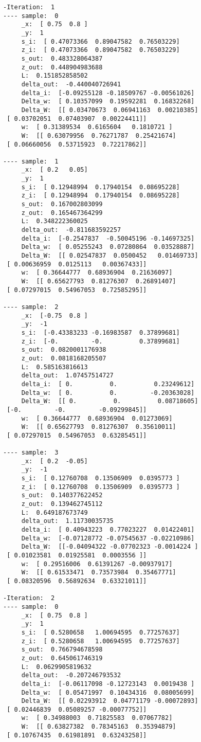 \documentclass[10pt]{article}
\begin{document}
\begin{multicols}{3}
\begin{tiny}
\begin{verbatim}
-Iteration:  1
---- sample:  0
     _x:  [ 0.75  0.8 ]
     _y:  1
     s_i:  [ 0.47073366  0.89047582  0.76503229]
     z_i:  [ 0.47073366  0.89047582  0.76503229]
     s_out:  0.483328064387
     z_out:  0.448904983688
     L:  0.151852858502
     delta_out:  -0.440040726941
     delta_i:  [-0.09255128 -0.18509767 -0.00561026]
     Delta_w:  [ 0.10357099  0.19592281  0.16832268]
     Delta_W:  [[ 0.03470673  0.06941163  0.00210385]
 [ 0.03702051  0.07403907  0.00224411]]
     w:  [ 0.31389534  0.6165604   0.1810721 ]
     W:  [[ 0.63079956  0.76271787  0.25421674]
 [ 0.06660056  0.53715923  0.72217862]]

---- sample:  1
     _x:  [ 0.2   0.05]
     _y:  1
     s_i:  [ 0.12948994  0.17940154  0.08695228]
     z_i:  [ 0.12948994  0.17940154  0.08695228]
     s_out:  0.167002803099
     z_out:  0.165467364299
     L:  0.348222360025
     delta_out:  -0.811683592257
     delta_i:  [-0.2547837  -0.50045196 -0.14697325]
     Delta_w:  [ 0.05255243  0.07280864  0.03528887]
     Delta_W:  [[ 0.02547837  0.0500452   0.01469733]
 [ 0.00636959  0.0125113   0.00367433]]
     w:  [ 0.36644777  0.68936904  0.21636097]
     W:  [[ 0.65627793  0.81276307  0.26891407]
 [ 0.07297015  0.54967053  0.72585295]]

---- sample:  2
     _x:  [-0.75  0.8 ]
     _y:  -1
     s_i:  [-0.43383233 -0.16983587  0.37899681]
     z_i:  [-0.         -0.          0.37899681]
     s_out:  0.0820001176938
     z_out:  0.0818168205507
     L:  0.585163816613
     delta_out:  1.07457514727
     delta_i:  [ 0.          0.          0.23249612]
     Delta_w:  [ 0.          0.         -0.20363028]
     Delta_W:  [[ 0.          0.          0.08718605]
 [-0.         -0.         -0.09299845]]
     w:  [ 0.36644777  0.68936904  0.01273069]
     W:  [[ 0.65627793  0.81276307  0.35610011]
 [ 0.07297015  0.54967053  0.63285451]]

---- sample:  3
     _x:  [ 0.2  -0.05]
     _y:  -1
     s_i:  [ 0.12760708  0.13506909  0.0395773 ]
     z_i:  [ 0.12760708  0.13506909  0.0395773 ]
     s_out:  0.140377622452
     z_out:  0.139462745112
     L:  0.649187673749
     delta_out:  1.11730035735
     delta_i:  [ 0.40943223  0.77023227  0.01422401]
     Delta_w:  [-0.07128772 -0.07545637 -0.02210986]
     Delta_W:  [[-0.04094322 -0.07702323 -0.0014224 ]
 [ 0.01023581  0.01925581  0.0003556 ]]
     w:  [ 0.29516006  0.61391267 -0.00937917]
     W:  [[ 0.61533471  0.73573984  0.35467771]
 [ 0.08320596  0.56892634  0.63321011]]

-Iteration:  2
---- sample:  0
     _x:  [ 0.75  0.8 ]
     _y:  1
     s_i:  [ 0.5280658   1.00694595  0.77257637]
     z_i:  [ 0.5280658   1.00694595  0.77257637]
     s_out:  0.766794678598
     z_out:  0.645061746319
     L:  0.0629905819632
     delta_out:  -0.207246793532
     delta_i:  [-0.06117098 -0.12723143  0.0019438 ]
     Delta_w:  [ 0.05471997  0.10434316  0.08005699]
     Delta_W:  [[ 0.02293912  0.04771179 -0.00072893]
 [ 0.02446839  0.05089257 -0.00077752]]
     w:  [ 0.34988003  0.71825583  0.07067782]
     W:  [[ 0.63827382  0.78345163  0.35394879]
 [ 0.10767435  0.61981891  0.63243258]]


\end{verbatim}
\end{tiny}
\end{multicols}
\end{document}
